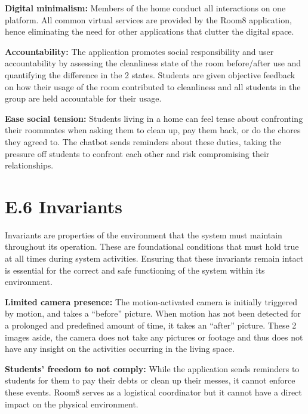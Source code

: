 \documentclass{scrreprt}
\newcommand*{\nsection}[1]{
    \section*{#1}
    \addcontentsline{toc}{section}{#1}
}
\theoremstyle{definition}
\begin{document}
\begin{flushleft}
  \item \textbf{Digital minimalism:} Members of the home conduct all interactions on one platform. All common virtual services are provided by the Room8 application, hence eliminating the need for other applications that clutter the digital space.\newline

  \item \textbf{Accountability:} The application promotes social responsibility and user accountability by assessing the cleanliness state of the room before/after use and quantifying the difference in the 2 states. Students are given objective feedback on how their usage of the room contributed to cleanliness and all students in the group are held accountable for their usage.\newline
  
  \item \textbf{Ease social tension:} Students living in a home can feel tense about confronting their roommates when asking them to clean up, pay them back, or do the chores they agreed to. The chatbot sends reminders about these duties, taking the pressure off students to confront each other and risk compromising their relationships.\newline 
\end{flushleft}

\nsection{E.6 Invariants}
Invariants are properties of the environment that the system must maintain throughout its operation. These are foundational conditions that must hold true at all times during system activities. Ensuring that these invariants remain intact is essential for the correct and safe functioning of the system within its environment.
\begin{flushleft}
  \item \textbf{Limited camera presence:} The motion-activated camera is initially triggered by motion, and takes a “before” picture. When motion has not been detected for a prolonged and predefined amount of time, it takes an “after” picture. These 2 images aside, the camera does not take any pictures or footage and thus does not have any insight on the activities occurring in the living space.  
  \newline
  \item \textbf{Students' freedom to not comply:} While the application sends reminders to students for them to pay their debts or clean up their messes, it cannot enforce these events. Room8 serves as a logistical coordinator but it cannot have a direct impact on the physical environment.
  \newline
\end{flushleft}
\end{document}
